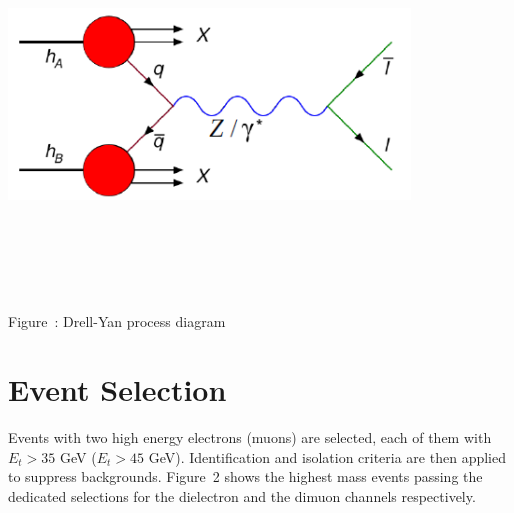 \documentclass[a0b,portrait,preview]{a0poster}
\begin{document}
\begin{multicols}{3}
\begin{minipage}{\figwidth}
\vspace{1.0cm}
\unitlength=1cm
\begin{center}
{\includegraphics[width= 0.8\textwidth,height=10.0cm]{figure/dyprocessbis.png}}
\label{fig:dydiag}
\newline
\addtocounter{figscount}{1} 
{\small \captcolor Figure~: Drell-Yan process diagram}
\end{center}
\vspace{1.5cm}
\end{minipage}

{\red \section*{\bf Event Selection}}
Events with two high energy electrons (muons) are selected, each of them with $E_t > 35$ GeV ($E_t > 45$ GeV).
Identification and isolation criteria are then applied to suppress backgrounds.
{\darkgreen Figure~2} shows the highest mass events passing the dedicated selections for the dielectron and the dimuon channels respectively.


\end{multicols}
\end{document}
